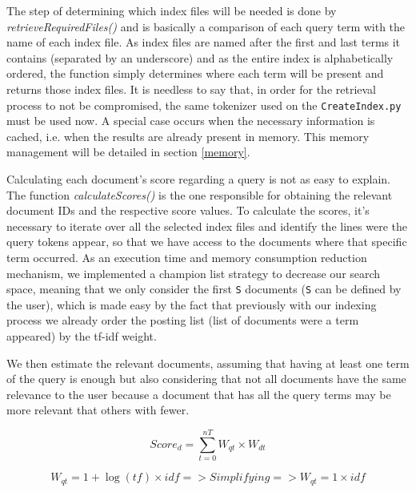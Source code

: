 \documentclass[12pt]{article}
\begin{document}
The step of determining which index files will be needed is done by 
\textit{retrieveRequiredFiles()} and is basically a comparison of each query 
term with the name of each index file.
As index files are named after the first and last terms it contains (separated
by an underscore) and as the entire index is alphabetically ordered, the function
simply determines where each term will be present and returns those index files. 
It is needless to say that, in order for the retrieval process to not be compromised, 
the same tokenizer used on the \texttt{CreateIndex.py} must be used now.
A special case occurs when the necessary information is cached, i.e. when the 
results are already present in memory. 
This memory management will be detailed in section \ref{memory}.

Calculating each document's score regarding a query is not as easy to explain. 
The function \textit{calculateScores()} is the one responsible for obtaining the 
relevant document IDs and the respective score values. 
To calculate the scores, it's necessary to iterate over all the selected index 
files and identify the lines were the query tokens appear, so that we have access 
to the documents where that specific term occurred.
As an execution time and memory consumption reduction mechanism, we implemented 
a champion list strategy to decrease our search space, meaning that we only 
consider the first \texttt{S} documents (\texttt{S} can be defined by the user), 
which is made easy by the fact that previously with our indexing process we 
already order the posting list (list of documents were a term appeared) by the 
tf-idf weight.

We then estimate the relevant documents, assuming that having at least one term 
of the query is enough but also considering that not all documents have the same 
relevance to the user because a document that has all the query terms may be more 
relevant that others with fewer.

\begin{equation}
  \label{score}
  Score_{d} = \sum_{t=0}^{nT} W_{qt} \times W_{dt}
\end{equation}

\begin{equation}
  \label{simple}
  W_{qt} = 1 + \log(tf) \times idf => Simplifying => W_{qt} = 1 \times idf
\end{equation}
\end{document}

